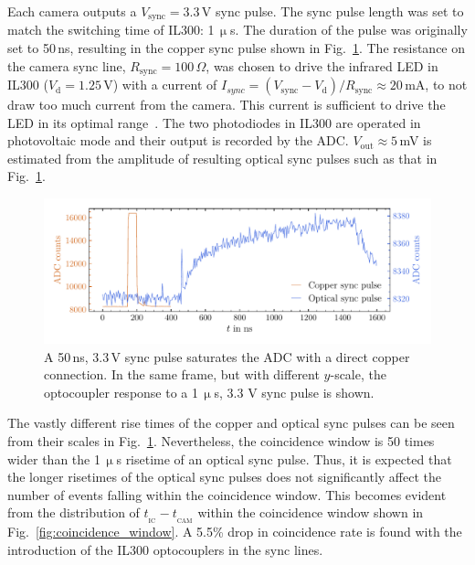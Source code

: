 Each camera outputs a $V_{\text{sync}} = 3.3$\,V sync pulse.  The sync pulse length was set to match the switching time of IL300: 1\,$\upmu$s. The duration of the pulse was originally set to 50\,ns, resulting in the copper sync pulse shown in Fig.~\ref{fig:sync_pulses}. The resistance on the camera sync line, $R_{\text{sync}} = 100\,\Omega$, was chosen to drive the infrared LED in IL300 ($V_\text{d} = 1.25$\,V) with a current of $I_{sync} = (V_{\text{sync}} - V_\text{d})/R_{\text{sync}} \approx 20$\,mA, to not draw too much current from the camera. This current is sufficient to drive the LED in its optimal range~\cite{il300}. The two photodiodes in IL300 are operated in photovoltaic mode and their output is recorded by the ADC. $V_{\text{out}} \approx 5$\,mV is estimated from the amplitude of resulting optical sync pulses such as that in Fig.~\ref{fig:sync_pulses}.
\begin{figure}[htb]
	\centering
	\vspace*{-10pt}
    \includegraphics[width=6in]{figs/param/sync_pulses_width_6_9in.pdf}
	\vspace*{-10mm}
	\caption{A 50\,ns, 3.3\,V sync pulse saturates the ADC with a direct copper connection. In the same frame, but with different $y$-scale, the optocoupler response to a 1\,$\upmu$s, 3.3 V sync pulse is shown.} 
	\label{fig:sync_pulses}
\end{figure}
The vastly different rise times of the copper and optical sync pulses can be seen from their scales in Fig.~\ref{fig:sync_pulses}.  Nevertheless, the coincidence window is 50 times wider than the 1\,$\upmu$s risetime of an optical sync pulse. Thus, it is expected that the longer risetimes of the optical sync pulses does not significantly affect the number of events falling within the coincidence window. This becomes evident from the distribution of $t_{_{\text{IC}}} - t_{_{\text{CAM}}}$ within the coincidence window shown in Fig.~\ref{fig:coincidence_window}. A 5.5\% drop in coincidence rate is found with the introduction of the IL300 optocouplers in the sync lines. 
